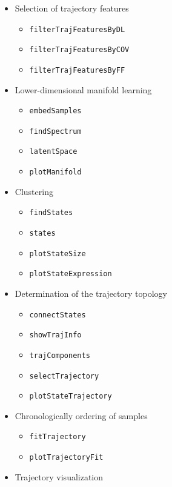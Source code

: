 \documentclass[]{book}
\providecommand{\tightlist}{%
  \setlength{\itemsep}{0pt}\setlength{\parskip}{0pt}}
\theoremstyle{definition}
\theoremstyle{definition}
\theoremstyle{definition}
\theoremstyle{remark}
\begin{document}
\begin{itemize}
\tightlist
\item
  Selection of trajectory features

  \begin{itemize}
  \tightlist
  \item
    \texttt{filterTrajFeaturesByDL}
  \item
    \texttt{filterTrajFeaturesByCOV}
  \item
    \texttt{filterTrajFeaturesByFF}
  \end{itemize}
\item
  Lower-dimensional manifold learning

  \begin{itemize}
  \tightlist
  \item
    \texttt{embedSamples}
  \item
    \texttt{findSpectrum}
  \item
    \texttt{latentSpace}
  \item
    \texttt{plotManifold}
  \end{itemize}
\item
  Clustering

  \begin{itemize}
  \tightlist
  \item
    \texttt{findStates}
  \item
    \texttt{states}
  \item
    \texttt{plotStateSize}
  \item
    \texttt{plotStateExpression}
  \end{itemize}
\item
  Determination of the trajectory topology

  \begin{itemize}
  \tightlist
  \item
    \texttt{connectStates}
  \item
    \texttt{showTrajInfo}
  \item
    \texttt{trajComponents}
  \item
    \texttt{selectTrajectory}
  \item
    \texttt{plotStateTrajectory}
  \end{itemize}
\item
  Chronologically ordering of samples

  \begin{itemize}
  \tightlist
  \item
    \texttt{fitTrajectory}
  \item
    \texttt{plotTrajectoryFit}
  \end{itemize}
\item
  Trajectory visualization


\end{itemize}
\end{document}
